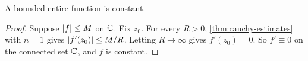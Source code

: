 \begin{theorem}\label{thm:liouville}
  A bounded entire function is constant.
\end{theorem}

\begin{proof}
  Suppose $\lvert f\rvert \leq M$ on $\mathbb{C}$. Fix $z_0$. For every $R > 0$,
  \cref{thm:cauchy-estimates} with $n = 1$ gives
  $\lvert f'(z_0)\rvert \leq M / R$. Letting $R \to \infty$ gives $f'(z_0) = 0$.
  So $f' \equiv 0$ on the connected set $\mathbb{C}$, and $f$ is constant.
\end{proof}

